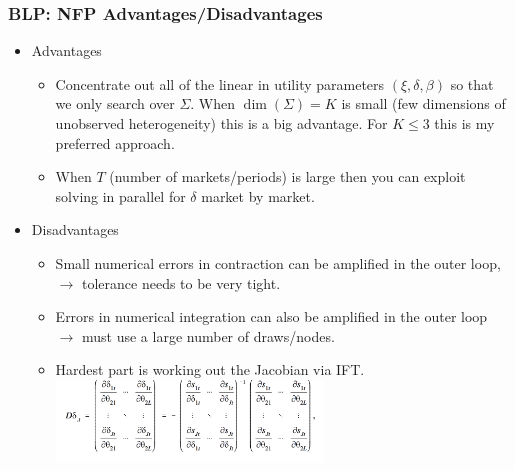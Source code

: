 \documentclass[aspectratio=169,11pt]{beamer}
\begin{document}
\begin{frame}
\frametitle{BLP: NFP Advantages/Disadvantages}
\begin{itemize}
\item Advantages
\begin{itemize}
\item Concentrate out all of the linear in utility parameters $(\xi,\delta,\beta)$ so that we only search over $\Sigma$. When $\dim(\Sigma)=K$ is small (few dimensions of unobserved heterogeneity) this is a big advantage. For $K \leq 3$ this is my preferred approach.
\item When $T$ (number of markets/periods) is large then you can exploit solving in parallel for $\delta$ market by market.
\end{itemize}
\item Disadvantages
\begin{itemize}
\item Small numerical errors in contraction can be amplified in the outer loop, $\rightarrow$ tolerance needs to be very tight.
\item Errors in numerical integration can also be amplified in the outer loop $\rightarrow$ must use a large number of draws/nodes.
\item Hardest part is working out the Jacobian via IFT.
\includegraphics[width=2.8in]{resources/implicit_function.png}\\
\end{itemize}
\end{itemize}
\end{frame}
\end{document}
